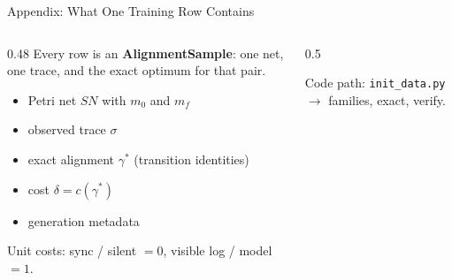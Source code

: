 \documentclass[aspectratio=169]{beamer}
\newcommand{\keyc}[1]{\textbf{\textcolor{larablue}{#1}}}
\begin{document}
\begin{frame}{Appendix: What One Training Row Contains}
  \begin{columns}[T]
  \begin{column}{0.48\textwidth}
    \small
    Every row is an \keyc{AlignmentSample}: one net, one trace, and the
    exact optimum for that pair.
    \vspace{2mm}
    \begin{itemize}\setlength{\itemsep}{3pt}
      \item Petri net $SN$ with $m_0$ and $m_f$
      \item observed trace $\sigma$
      \item exact alignment $\gamma^\ast$ (transition identities)
      \item cost $\delta=c(\gamma^\ast)$
      \item generation metadata
    \end{itemize}
    \vspace{1mm}
    \small Unit costs: sync / silent $=0$, visible log / model $=1$.
  \end{column}
  \begin{column}{0.5\textwidth}
    \begin{center}
    \end{center}
    \vspace{1mm}
    \centering\small
    Code path: \texttt{init\_data.py} $\to$ families, exact, verify.
  \end{column}
  \end{columns}
\end{frame}
\end{document}
